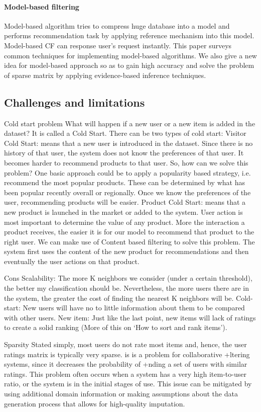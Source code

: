 \paragraph{Model-based filtering}



Model-based algorithm tries to compress huge database into a model and 
performs recommendation task by applying reference mechanism into this model. Model-based CF can response 
user’s request instantly. This paper surveys common techniques for implementing model-based algorithms. We 
also give a new idea for model-based approach so as to gain high accuracy and solve the problem of sparse 
matrix by applying evidence-based inference techniques. 

\subsection{Challenges and limitations} \hfill \break



Cold start problem
What will happen if a new user or a new item is added in the dataset? It is called a Cold Start. There can be two types of cold start:
	Visitor Cold Start: means that a new user is introduced in the dataset. Since there is no history of that user, the system does not 
know the preferences of that user. It becomes harder to recommend products to that user. So, how can we solve this problem? One basic
approach could be to apply a popularity based strategy, i.e. recommend the most popular products. These can be determined by what has
been popular recently overall or regionally. Once we know the preferences of the user, recommending products will be easier.
	Product Cold Start: means that a new product is launched in the market or added to the system. User action is most important to
determine the value of any product. More the interaction a product receives, the easier it is for our model to recommend that product
to the right user. We can make use of Content based filtering to solve this problem. The system first uses the content of the new 
product for recommendations and then eventually the user actions on that product.


  Cons
	Scalability: The more K neighbors we consider (under a certain threshold), the better my classification should be. 
  Nevertheless, the more users there are in the system, the greater the cost of finding the nearest K neighbors will be.
	Cold-start: New users will have no to little information about them to be compared with other users.
	New item: Just like the last point, new items will lack of ratings to create a solid ranking (More of this on ‘How to sort 
  and rank items’).

Sparsity
Stated simply, most users do not rate most items and, hence, the user ratings matrix is typically very sparse. is is a problem for 
collaborative +ltering systems, since it decreases the probability of +nding a set of users with similar ratings. This problem often 
occurs when a system has a very high item-to-user ratio, or the system is in the initial stages of use. This issue can be mitigated by 
using additional domain information or making assumptions about the data generation process that allows for high-quality imputation.

